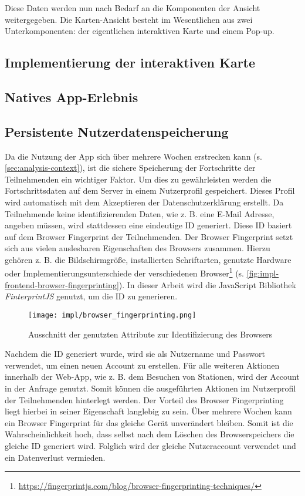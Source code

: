 Diese Daten werden nun nach Bedarf an die Komponenten der Ansicht weitergegeben.
Die Karten-Ansicht besteht im Wesentlichen aus zwei Unterkomponenten: der
eigentlichen interaktiven Karte und einem Pop-up.

\subsection{Implementierung der interaktiven Karte}


\subsection{Natives App-Erlebnis}

\subsection{Persistente Nutzerdatenspeicherung}

Da die Nutzung der App sich über mehrere Wochen erstrecken kann (s.
\autoref{sec:analysis-context}), ist die sichere Speicherung der Fortschritte
der Teilnehmenden ein wichtiger Faktor. Um dies zu gewährleisten werden die
Fortschrittsdaten auf dem Server in einem Nutzerprofil gespeichert. Dieses
Profil wird automatisch mit dem Akzeptieren der Datenschutzerklärung erstellt.
Da Teilnehmende keine identifizierenden Daten, wie z. B. eine E-Mail Adresse,
angeben müssen, wird stattdessen eine eindeutige ID generiert. Diese ID basiert
auf dem Browser Fingerprint der Teilnehmenden. Der Browser Fingerprint setzt
sich aus vielen auslesbaren Eigenschaften des Browsers zusammen. Hierzu gehören
z. B. die Bildschirmgröße, installierten Schriftarten, genutzte Hardware oder
Implementierungsunterschiede der verschiedenen
Browser\footnote{\url{https://fingerprintjs.com/blog/browser-fingerprinting-techniques/}}
(s. \autoref{fig:impl-frontend-browser-fingerprinting}). In dieser Arbeit wird
die JavaScript Bibliothek \textit{FinterprintJS} \cite{FingerprintJS2022}
genutzt, um die ID zu generieren.

\begin{figure}[htpb]
    \centering
    \texttt{[image: impl/browser\_fingerprinting.png]}
    \caption{Ausschnitt der genutzten Attribute zur Identifizierung des Browsers
    \cite{FingerprintJS2022}}
    \label{fig:impl-frontend-browser-fingerprinting}
\end{figure}

Nachdem die ID generiert wurde, wird sie als Nutzername und Passwort verwendet,
um einen neuen Account zu erstellen. Für alle weiteren Aktionen innerhalb der
Web-App, wie z. B. dem Besuchen von Stationen, wird der Account in der Anfrage
genutzt. Somit können die ausgeführten Aktionen im Nutzerprofil der
Teilnehmenden hinterlegt werden. Der Vorteil des Browser Fingerprinting liegt
hierbei in seiner Eigenschaft langlebig zu sein. Über mehrere Wochen kann
ein Browser Fingerprint für das gleiche Gerät unverändert bleiben. Somit ist die
Wahrscheinlichkeit hoch, dass selbst nach dem Löschen des Browserspeichers die
gleiche ID generiert wird. Folglich wird der gleiche Nutzeraccount verwendet und
ein Datenverlust vermieden.


